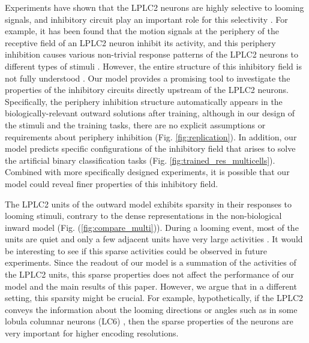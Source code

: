 \documentclass[pdftex,9pt,lineno]{elife}
\begin{document}
Experiments have shown that the LPLC2 neurons are highly selective to looming signals, and inhibitory circuit play an important role for this selectivity \citep{klapoetke2017ultra}. For example, it has been found that the motion signals at the periphery of the receptive field of an LPLC2 neuron inhibit its activity, and this periphery inhibition causes various non-trivial response patterns of the LPLC2 neurons to different types of stimuli \citep{klapoetke2017ultra}. However, the entire structure of this inhibitory field is not fully understood \citep{klapoetke2017ultra}. Our model provides a promising tool to investigate the properties of the inhibitory circuits directly upstream of the LPLC2 neurons. Specifically, the periphery inhibition structure automatically appears in the biologically-relevant outward solutions after training, although in our design of the stimuli and the training tasks, there are no explicit assumptions or requirements about periphery inhibition (Fig. \ref{fig:replication}). In addition, our model predicts specific configurations of the inhibitory field that arises to solve the artificial binary classification tasks (Fig. \ref{fig:trained_res_multicells}). Combined with more specifically designed experiments, it is possible that our model could reveal finer properties of this inhibitory field.

The LPLC2 units of the outward model exhibits sparsity in their responses to looming stimuli, contrary to the dense representations in the non-biological inward model (Fig. (\ref{fig:compare_multi})). During a looming event, most of the units are quiet and only a few adjacent units have very large activities \citep{olshausen1997sparse}. It would be interesting to see if this sparse activities could be observed in future experiments. Since the readout of our model is a summation of the activities of the LPLC2 units, this sparse properties does not affect the performance of our model and the main results of this paper. However, we argue that in a different setting, this sparsity might be crucial. For example, hypothetically, if the LPLC2 conveys the information about the looming directions or angles such as in some lobula columnar neurons (LC6) \citep{morimoto2020spatial}, then the sparse properties of the neurons are very important for higher encoding resolutions.
\end{document}
